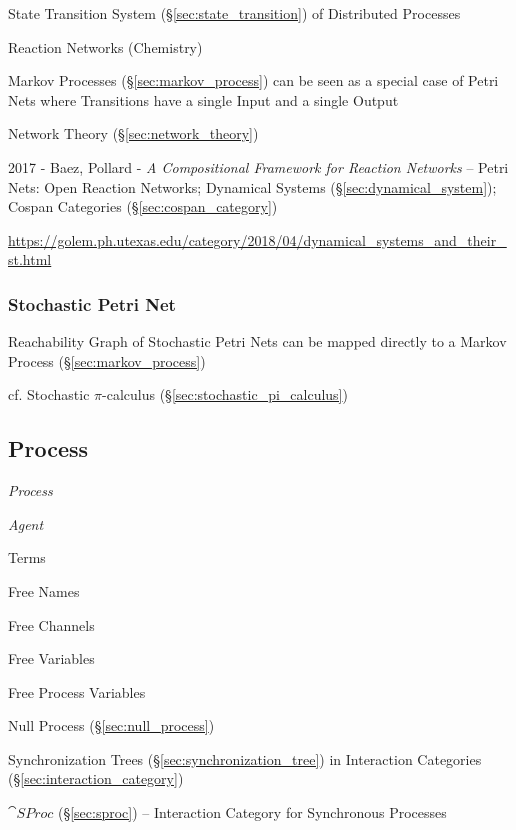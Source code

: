 State Transition System (\S\ref{sec:state_transition}) of Distributed
Processes

Reaction Networks (Chemistry)

Markov Processes (\S\ref{sec:markov_process}) can be seen as a special
case of Petri Nets where Transitions have a single Input and a single
Output

\fist Network Theory (\S\ref{sec:network_theory})

2017 - Baez, Pollard - \emph{A Compositional Framework for Reaction Networks}
-- Petri Nets: Open Reaction Networks; Dynamical Systems
(\S\ref{sec:dynamical_system}); Cospan Categories (\S\ref{sec:cospan_category})

\url{https://golem.ph.utexas.edu/category/2018/04/dynamical_systems_and_their_st.html}



\subsubsection{Stochastic Petri Net}\label{sec:stochastic_petri_net}

Reachability Graph of Stochastic Petri Nets can be mapped directly to
a Markov Process (\S\ref{sec:markov_process})

\fist cf. Stochastic $\pi$-calculus (\S\ref{sec:stochastic_pi_calculus})



\subsection{Process}\label{sec:process}

\emph{Process}

\emph{Agent}

Terms

Free Names

Free Channels

Free Variables

Free Process Variables

Null Process (\S\ref{sec:null_process})


\asterism


Synchronization Trees (\S\ref{sec:synchronization_tree}) in
Interaction Categories (\S\ref{sec:interaction_category})

$\cat{SProc}$ (\S\ref{sec:sproc}) -- Interaction Category for
Synchronous Processes

